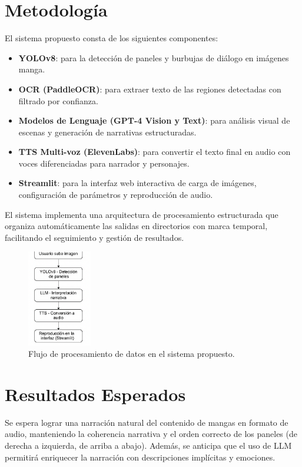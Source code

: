 \documentclass[conference]{IEEEtran}
\begin{document}
\section{Metodología}
El sistema propuesto consta de los siguientes componentes:
\begin{itemize}
\item \textbf{YOLOv8}: para la detección de paneles y burbujas de diálogo en imágenes manga.
\item \textbf{OCR (PaddleOCR)}: para extraer texto de las regiones detectadas con filtrado por confianza.
\item \textbf{Modelos de Lenguaje (GPT-4 Vision y Text)}: para análisis visual de escenas y generación de narrativas estructuradas.
\item \textbf{TTS Multi-voz (ElevenLabs)}: para convertir el texto final en audio con voces diferenciadas para narrador y personajes.
\item \textbf{Streamlit}: para la interfaz web interactiva de carga de imágenes, configuración de parámetros y reproducción de audio.
\end{itemize}
El sistema implementa una arquitectura de procesamiento estructurada que organiza automáticamente las salidas en directorios con marca temporal, facilitando el seguimiento y gestión de resultados.

\begin{figure}[ht]
\centering
\includegraphics[width=0.25\textwidth]{resources/flujo_datos.png}
\caption{Flujo de procesamiento de datos en el sistema propuesto.}
\label{fig:flujo}
\end{figure}

\section{Resultados Esperados}
Se espera lograr una narración natural del contenido de mangas en formato de audio, manteniendo la coherencia narrativa y el orden correcto de los paneles (de derecha a izquierda, de arriba a abajo). Además, se anticipa que el uso de LLM permitirá enriquecer la narración con descripciones implícitas y emociones.
\end{document}
